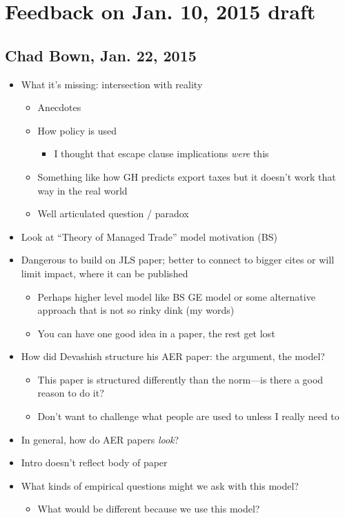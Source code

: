 \documentclass[12pt]{article}
\begin{document}
\newpage
\section{Feedback on Jan. 10, 2015 draft}

\subsection{Chad Bown, Jan. 22, 2015}
\begin{itemize}
	\item What it's missing: intersection with reality
		\begin{itemize}
			\item Anecdotes
			\item How policy is used
				\begin{itemize}
					\item I thought that escape clause implications \textit{were} this
				\end{itemize}
			\item Something like how GH predicts export taxes but it doesn't work that way in the real world
			\item Well articulated question / paradox
		\end{itemize}
	\item Look at ``Theory of Managed Trade'' model motivation (BS)
	\item Dangerous to build on JLS paper; better to connect to bigger cites or will limit impact, where it can be published
		\begin{itemize}
			\item Perhaps higher level model like BS GE model or some alternative approach that is not so rinky dink (my words)
			\item You can have one good idea in a paper, the rest get lost
		\end{itemize}
	\item How did Devashish structure his AER paper: the argument, the model?
		\begin{itemize}
			\item This paper is structured differently than the norm---is there a good reason to do it?
			\item Don't want to challenge what people are used to unless I really need to
		\end{itemize}
	\item In general, how do AER papers \textit{look}?
	\item Intro doesn't reflect body of paper
	\item What kinds of empirical questions might we ask with this model?
		\begin{itemize}
			\item What would be different because we use this model?
		\end{itemize}
\end{itemize}
\end{document}
